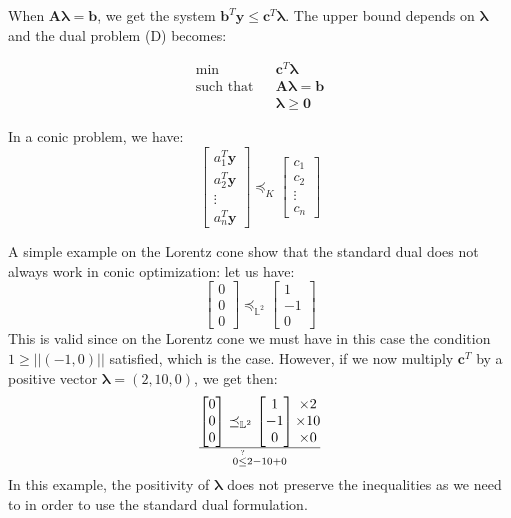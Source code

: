 When $\boldsymbol{A\lambda}=\boldsymbol{b}$, we get the system $\boldsymbol{b}^T \boldsymbol{y} \leq \boldsymbol{c}^T \boldsymbol{\lambda}$. The upper bound depends on $\boldsymbol{\lambda}$ and the dual problem (D) becomes:

\begin{eqnarray*}
\min & & \boldsymbol{c}^T \boldsymbol{\lambda}\\
\text{such that}& &\boldsymbol{A\lambda}=\boldsymbol{b}\\
             & &\boldsymbol{\lambda} \geq \boldsymbol{0}
\end{eqnarray*}

In a conic problem, we have:
\[\begin{bmatrix}
 a_1^T \boldsymbol{y}\\
 a_2^T \boldsymbol{y}\\
 \vdots\\
 a_n^T \boldsymbol{y}
\end{bmatrix} \preceq_K \begin{bmatrix}
 c_1\\
 c_2\\
 \vdots\\
 c_n
\end{bmatrix}\]

A simple example on the Lorentz cone show that the standard dual does not always work in conic optimization: let us have:
\[\begin{bmatrix}
 0\\
 0\\
 0
\end{bmatrix} \preceq_{\mathbb{L}^2} \begin{bmatrix}
 1\\
 -1\\
 0
\end{bmatrix}\]
This is valid since on the Lorentz cone we must have in this case the condition $1\geq ||(-1,0)||$ satisfied, which is the case. However, if we now multiply $\boldsymbol{c}^T$ by a positive vector $\boldsymbol{\lambda}=(2,10,0)$, we get then:
\[\begin{bmatrix}
 0\\
 0\\
 0
\end{bmatrix} \preceq_{\mathbb{L}^2} \begin{bmatrix}
 1\\
 -1\\
 0
\end{bmatrix}\begin{matrix}
 \times 2\\
 \times 10\\
 \times 0
\end{matrix}\over
0 \stackrel{?}{\leq} 2-10+0\]
In this example, the positivity of $\boldsymbol{\lambda}$ does not preserve the inequalities as we need to in order to use the standard dual formulation.\\

